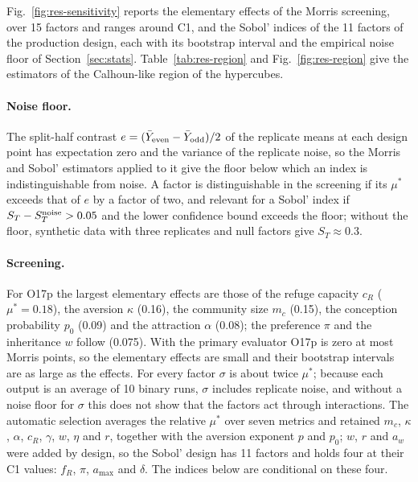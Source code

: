 Fig.~\ref{fig:res-sensitivity} reports the elementary effects of the Morris screening, over 15 factors and ranges
around \textsf{C1}, and the Sobol' indices of the 11 factors of the production design, each with its bootstrap interval
and the empirical noise floor of Section~\ref{sec:stats}. Table~\ref{tab:res-region} and Fig.~\ref{fig:res-region}
give the estimators of the Calhoun-like region of the hypercubes.

\paragraph{Noise floor.}
The split-half contrast $e=(\bar Y_{\rm even}-\bar Y_{\rm odd})/2$ of the replicate means at each design point has
expectation zero and the variance of the replicate noise, so the Morris and Sobol' estimators applied to it give the
floor below which an index is indistinguishable from noise. A factor is distinguishable in the screening if its
$\mu^*$ exceeds that of $e$ by a factor of two, and relevant for a Sobol' index if $S_T-S_T^{\rm noise}>0.05$ and the
lower confidence bound exceeds the floor; without the floor, synthetic data with three replicates and null factors
give $S_T\approx0.3$.

\paragraph{Screening.}
For O17p the largest elementary effects are those of the refuge capacity $c_R$ ($\mu^*=0.18$), the aversion
$\kappa$ (0.16), the community size $m_c$ (0.15), the conception probability $p_0$ (0.09) and the attraction
$\alpha$ (0.08); the preference $\pi$ and the inheritance $w$ follow (0.075). With the primary evaluator O17p is
zero at most Morris points, so the elementary effects are small and their bootstrap intervals are as large as the
effects. For every factor $\sigma$ is about twice $\mu^*$; because each output is an average of 10 binary runs,
$\sigma$ includes replicate noise, and without a noise floor for $\sigma$ this does not show that the factors act
through interactions. The automatic selection averages the relative $\mu^*$ over seven metrics and retained $m_c$,
$\kappa$, $\alpha$, $c_R$, $\gamma$, $w$, $\eta$ and $r$, together with the aversion exponent $p$ and $p_0$; $w$, $r$ and
$a_w$ were added by design, so the Sobol' design has 11 factors and holds four at their
\textsf{C1} values: $f_R$, $\pi$, $a_{\max}$ and $\delta$. The indices below are conditional on these four.

